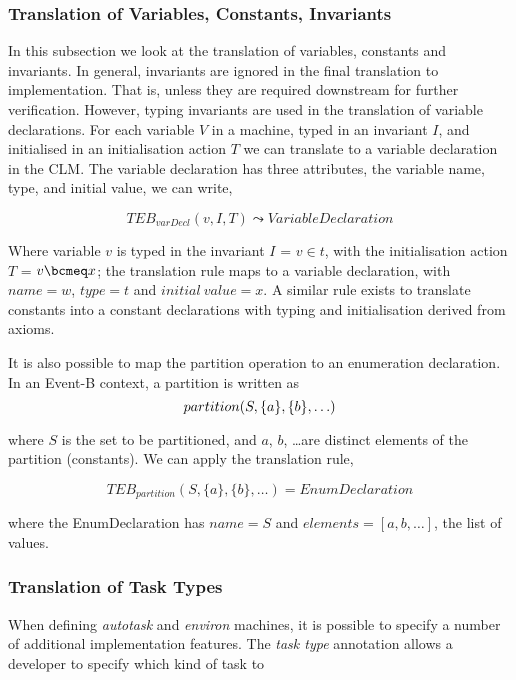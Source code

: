 \subsubsection{Translation of Variables, Constants, Invariants} 
In this subsection we look at the translation of variables, constants and invariants. In general, invariants are ignored in the final translation to implementation. That is, unless they are required downstream for further verification. However, typing invariants are used in the translation of variable declarations. For each variable $V$ in a machine, typed in an invariant $I$, and initialised in an initialisation action $T$ we can translate to a variable declaration in the CLM. The variable declaration has three attributes, the variable name, type, and initial value, we can write,

\begin{equation}
TEB_{varDecl}(v, I, T) \leadsto VariableDeclaration
\end{equation}

Where variable $v$ is typed in the invariant $I$ = $v\in t$, with the initialisation action $T$ = $v\bcmeq x$; the translation rule maps to a variable declaration, with $name=w$, $type=t$ and $initial~value=x $. A similar rule exists to translate constants into a constant declarations with typing and initialisation derived from axioms. 

It is also possible to map the partition operation to an enumeration declaration. In an Event-B context, a partition is written as 
%
\begin{equation}
partition(S,\{a\},\{b\},\ldots)
\notag
\end{equation}

where $S$ is the set to be partitioned, and $a$, $b$, \ldots are distinct elements of the partition (constants). We can apply the translation rule,

\begin{equation}
TEB_{partition}(S,\{a\},\{b\},\ldots) = EnumDeclaration
\end{equation}

where the EnumDeclaration has $name=S$ and $elements=[a,b,\ldots]$, the list of values.

\subsubsection{Translation of Task Types }
When defining \emph{autotask} and \emph{environ} machines, it is possible to specify a number of additional implementation features. The \emph{task type} annotation allows a developer to specify which kind of task to 

